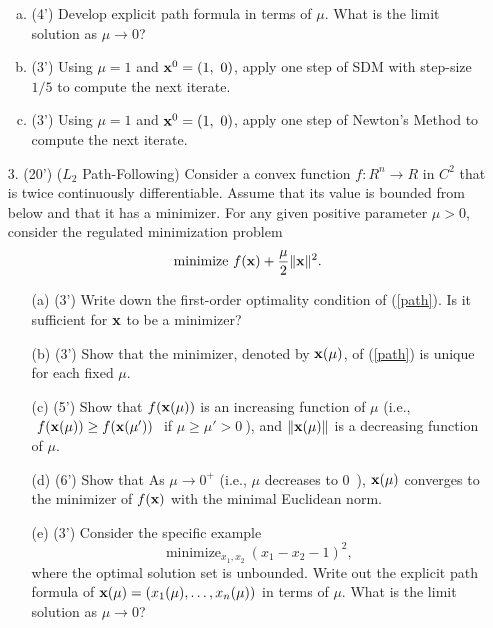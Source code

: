 \documentclass[12pt,letterpaper]{article}
\newcommand\x{{\bf x}}
\begin{document}
\begin{enumerate}
\begin{enumerate}[(a)]
\item (4') Develop explicit path formula in terms of $\mu$. What is the limit solution as $\mu\rightarrow 0$?

\item (3') Using $\mu=1$ and $\x^0=(1,\ 0)$, apply one step of SDM with step-size $1/5$ to compute the next iterate.

\item (3') Using $\mu=1$ and $\x^0=(1,\ 0)$, apply one step of Newton's Method to compute the next iterate.
\end{enumerate}

\item[3.] (20') ($L_2$ Path-Following) Consider a convex function $f: R^n \to R$ in $C^2$ that is twice continuously differentiable.  Assume that its value is bounded from below and that it has a minimizer.  For any given positive parameter $\mu>0$, consider the regulated minimization problem
\begin{equation}\label{path}
\text{minimize}\ f(\x)+\frac{\mu}{2}\|\x\|^2.
\end{equation}

\begin{enumerate}
\item[(a)] (3') Write down the first-order optimality condition of (\ref{path}). Is it sufficient for $\x$ to be a minimizer?

\item[(b)] (3') Show that the minimizer, denoted by $\x(\mu)$, of (\ref{path}) is unique for each fixed $\mu$.

\item[(c)] (5') Show that $f(\x(\mu))$ is an increasing function of $\mu$ (i.e., $\ f(\x(\mu))\ge f(\x(\mu'))\ $ if $\mu\ge\mu'>0\ $), and $\|\x(\mu)\|$ is a decreasing function of $\mu$.

\item[(d)] (6') Show that As $\mu\rightarrow 0^+$ (i.e., $\mu$ decreases to $0$\ ), $\x(\mu)$ converges to the minimizer of $f(\x)$ with the minimal Euclidean norm.

\item[(e)] (3') Consider the specific example 
\[\text{minimize}_{x_1,x_2}\ (x_1-x_2-1)^2,\]
where the optimal solution set is unbounded. Write out the explicit path formula of $\x(\mu)=(x_1(\mu),\dots,x_n(\mu))$ in terms of $\mu$. What is the limit solution as $\mu\rightarrow 0$?
\end{enumerate}
\clearpage


\end{enumerate}
\end{document}
